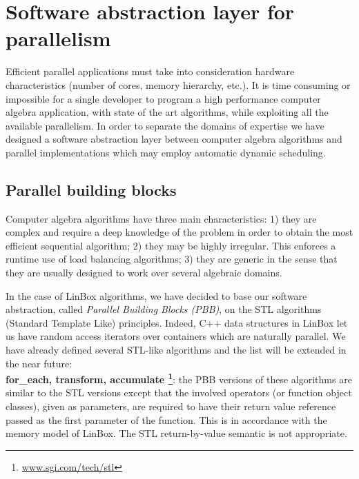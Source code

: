\documentclass[runningheads,a4paper]{llncs}
\newcommand{\linbox}{{\sc LinBox}\xspace}
\begin{document}
%
\section{Software abstraction layer for parallelism}

Efficient parallel applications must take into consideration hardware
characteristics (number of cores, memory hierarchy, etc.). It is time
consuming or impossible for a single developer to 
program a high performance computer algebra application, with state of
the art algorithms, while exploiting all the available parallelism.  
In order to separate the domains of expertise we have designed a
software abstraction layer between computer algebra algorithms
and parallel implementations which may employ automatic dynamic scheduling.

\subsection{Parallel building blocks}\label{ssec:parallel}
Computer algebra algorithms have three main characteristics:
1) they are complex and require a deep knowledge of the problem in
  order to obtain the most efficient sequential algorithm;
2) they may be highly irregular. This enforces a runtime use of
  load balancing algorithms;
3) they are generic in the sense that they are usually designed
  to work over several algebraic domains.

  In the case of \linbox algorithms, we have decided to base our
  software abstraction, called {\em Parallel Building Blocks (PBB)},
  on the STL algorithms (Standard Template Like) principles.
%
  Indeed, C++ data structures in \linbox let us have random access
  iterators over containers which are naturally parallel. 
% 
  We have already defined several STL-like algorithms and the list
  will be extended in the near future:\\
  {\bf for\_each, transform, accumulate
    \footnote{\url{www.sgi.com/tech/stl}}}: the PBB
  versions of these algorithms are similar to the STL versions 
  except that the involved operators (or function object classes), given as 
  parameters, are required to have their return value reference passed as the
  first parameter of the function. This is in accordance with the memory model 
  of \linbox. 
  The STL return-by-value semantic is not appropriate. 
\end{document}
